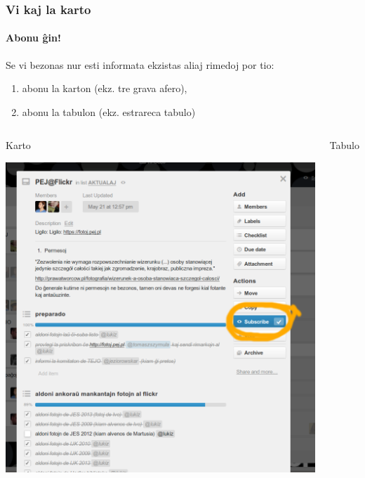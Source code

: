 \documentclass{beamer}
\begin{document}
  \begin{frame}
    \frametitle{Vi kaj la karto}
    \framesubtitle{Abonu ĝin!}
		
	Se vi bezonas nur esti informata \alert{ekzistas aliaj rimedoj por tio}:
	\begin{enumerate}
		\item abonu la karton (ekz. tre grava afero),
		\item abonu la tabulon (ekz. estrareca tabulo)
	\end{enumerate}
	
	\begin{columns}
	    \begin{block}{Karto}
	    	\begin{center}
	     	\includegraphics[scale=0.10]{ekranoj/abonu-karton}
	    	\end{center}
    	\end{block}
    	\begin{block}{Tabulo}
    		\begin{center}

\end{center}
\end{block}
\end{columns}
\end{frame}
\end{document}
